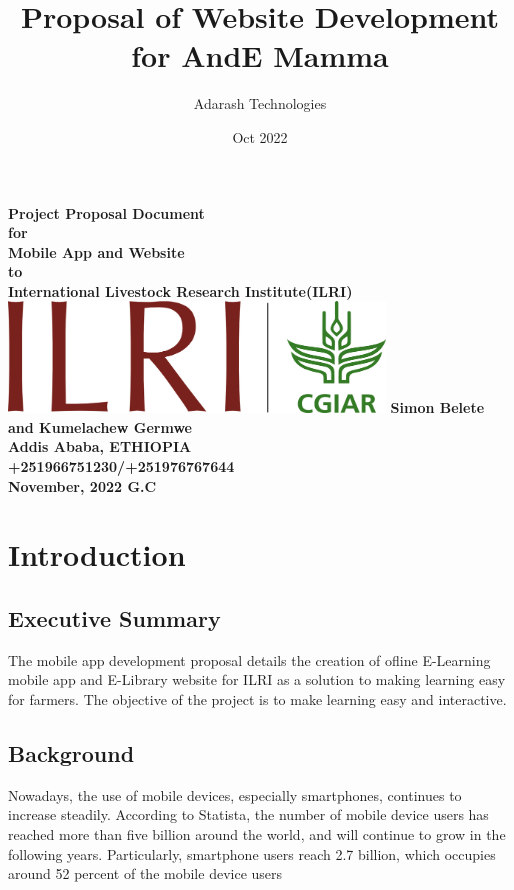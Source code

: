 \documentclass[12pt]{extarticle}
\title{Proposal of Website Development for AndE Mamma}
\author{{Adarash Technologies}}
\date{Oct 2022}
\begin{document}
\begin{titlepage}
    \centering
    \vfill
    {\bfseries\Large
        Project Proposal Document\\
        for\\
        Mobile App and Website\\
        \vskip2cm
        to\\
        International Livestock Research Institute(ILRI)\\
    }    
    \vfill
    \includegraphics[width=10cm]{ilri.png}
    \vfill 
    \vfill 
    \vspace{15pt}
    \textbf{Simon Belete and Kumelachew Germwe\\
			Addis Ababa, ETHIOPIA\\
			+251966751230/+251976767644 \\
			November, 2022 G.C
		}
    
    \vfill
\end{titlepage}

\newpage

\tableofcontents
\newpage


\section{Introduction}
\subsection{Executive Summary}
The mobile app development proposal details the creation of ofline E-Learning mobile app and E-Library website for ILRI as a solution to making learning easy for farmers. The objective of the project is to make learning easy and interactive.

\subsection{Background}
Nowadays, the use of mobile devices, especially smartphones, continues to increase steadily. According to Statista,
the number of mobile device users has reached more than
five billion around the world, and will continue to grow in
the following years. Particularly, smartphone users reach 2.7
billion, which occupies around 52 percent of the mobile device
users
\end{document}
